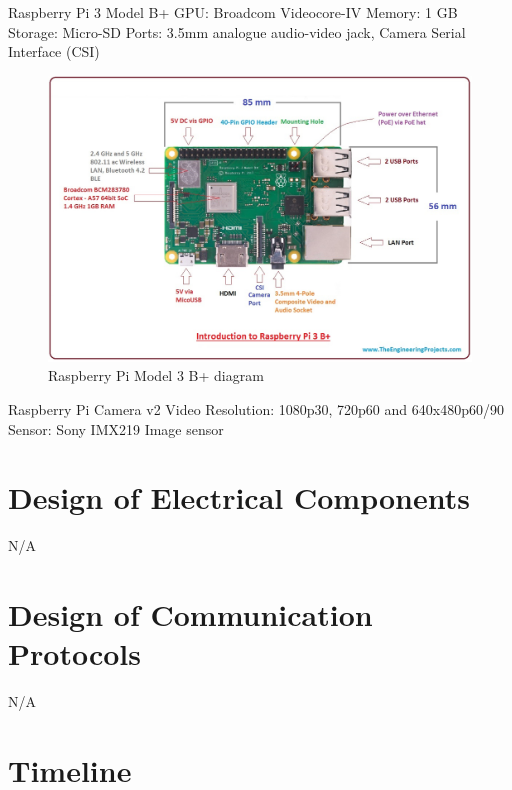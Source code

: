 \documentclass[12pt, titlepage]{article}
\begin{document}
Raspberry Pi 3 Model B+
GPU: Broadcom Videocore-IV
Memory: 1 GB
Storage: Micro-SD
Ports: 3.5mm analogue audio-video jack, Camera Serial Interface (CSI)

\begin{figure}[H] 
\centering
\includegraphics[width=\textwidth,height=0.88\textheight,keepaspectratio]{PiBoard.jpg} 
\caption{Raspberry Pi Model 3 B+ diagram} 
\label{Fig.Pi_Board} 
\end{figure}

Raspberry Pi Camera v2
Video Resolution: 1080p30, 720p60 and 640x480p60/90
Sensor: Sony IMX219 Image sensor

\section{Design of Electrical Components}

N/A

\section{Design of Communication Protocols}

N/A

\section{Timeline}
\end{document}
